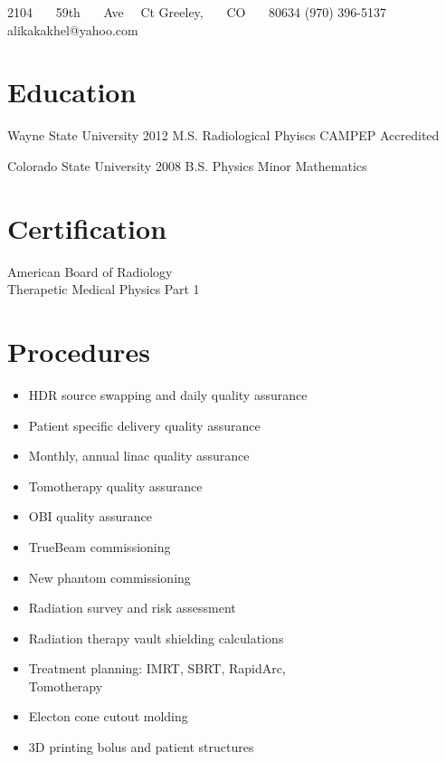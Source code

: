 \documentclass{tccv-grey}
\begin{document}
\personal
    {2104 \ \ \  59th \ \ \  Ave \ \  Ct \newline Greeley, \ \ \  CO \ \ \  80634}
    {(970) 396-5137}
    {alikakakhel@yahoo.com}

\section{Education}
\begin{yearlist}
    \item[Wayne State University]{2012}
         {M.S. Radiological Phyiscs}
         {CAMPEP Accredited}
    \item[Colorado State University]{2008}
         {B.S. Physics}
         {Minor Mathematics}
\end{yearlist}

\section{Certification}
American Board of Radiology\\
Therapetic Medical Physics Part 1

\section{Procedures}
\begin{itemize}[noitemsep]
    \item HDR source swapping and daily quality assurance
    \item Patient specific delivery quality assurance
    \item Monthly, annual linac quality assurance
    \item Tomotherapy quality assurance
    \item OBI quality assurance
    \item TrueBeam commissioning
    \item New phantom commissioning
    \item Radiation survey and risk assessment
    \item Radiation therapy vault shielding calculations
    \item Treatment planning: IMRT, SBRT, RapidArc, \\ Tomotherapy
    \item Electon cone cutout molding
    \item 3D printing bolus and patient structures
\end{itemize}
\end{document}
